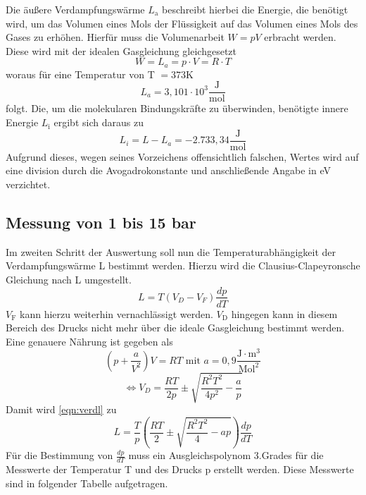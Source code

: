 \noindent
Die äußere Verdampfungswärme $L_{\text{a}}$ beschreibt hierbei die Energie, die benötigt wird, um das Volumen eines Mols der Flüssigkeit auf das Volumen eines Mols des Gases zu
erhöhen. Hierfür muss die Volumenarbeit $W = pV$ erbracht werden. Diese wird mit der idealen Gasgleichung gleichgesetzt
\begin{equation*}
  W = L_a = p\cdot V = R \cdot T
\end{equation*}
woraus für eine Temperatur von T $= 373$K 
\begin{equation*}
  L_a = 3,101 \cdot 10^3 \mathrm{\frac{J}{mol}}
\end{equation*}
folgt.
\newline
Die, um die molekularen Bindungskräfte zu überwinden, benötigte innere Energie $L_{\text{i}}$ ergibt sich daraus zu
\begin{equation*}
  L_i = L - L_a = -2.733,34 \mathrm{\frac{J}{mol}}
\end{equation*}
Aufgrund dieses, wegen seines Vorzeichens offensichtlich falschen, Wertes wird auf eine division durch die Avogadrokonstante und anschließende Angabe in eV verzichtet.

\subsection{Messung von 1 bis 15 bar}
Im zweiten Schritt der Auswertung soll nun die Temperaturabhängigkeit der Verdampfungswärme L bestimmt werden. Hierzu wird die Clausius-Clapeyronsche Gleichung nach L umgestellt.
\begin{equation}
  L = T(V_D - V_F)\frac{dp}{dT}
  \label{eqn:verdl}
\end{equation}
$V_{\text{F}}$ kann hierzu weiterhin vernachlässigt werden. $V_{\text{D}}$ hingegen kann in diesem Bereich des Drucks nicht mehr über die ideale Gasgleichung bestimmt werden.
Eine genauere Nährung ist gegeben als 
\begin{equation*}
  \left(p+\frac{a}{V^2}\right)V = RT \, \, \mathrm{mit} \, \, a = 0,9 \mathrm{\frac{J \cdot m^3}{Mol^2}} 
\end{equation*}
\begin{equation*}
  \Leftrightarrow V_D = \frac{RT}{2p} \pm \sqrt{\frac{R^2T^2}{4p^2}-\frac{a}{p}}
\end{equation*}
Damit wird \autoref{eqn:verdl} zu
\begin{equation*}
  L = \frac{T}{p} \left(\frac{RT}{2} \pm \sqrt{\frac{R^2T^2}{4}-ap}\right)\frac{dp}{dT}
  \label{eqn:verdl2}
\end{equation*}
Für die Bestimmung von $\frac{dp}{dT}$ muss ein Ausgleichspolynom 3.Grades für die Messwerte der Temperatur T und des Drucks p erstellt werden. Diese Messwerte sind in folgender
Tabelle aufgetragen.

